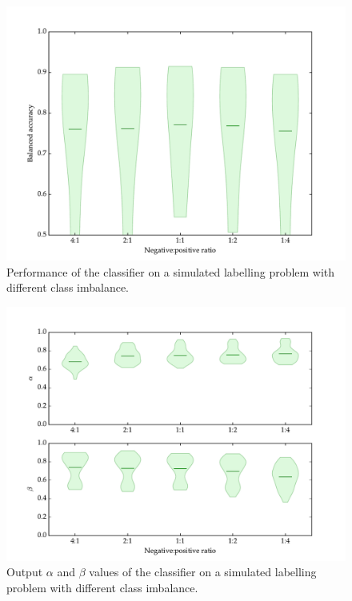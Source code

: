             \begin{figure}[!ht]
                \centering
                \includegraphics[width=\textwidth]
                    {images/experiments/raykar_class_balance_ba}
                \caption{Performance of the \citeauthor{raykar10} classifier on
                    a simulated labelling problem with different class
                    imbalance.}
                \label{fig:raykar-class-balance-ba}
            \end{figure}

            \begin{figure}[!ht]
                \centering
                \includegraphics[width=\textwidth]
                    {images/experiments/raykar_class_balance}
                \caption{Output $\alpha$ and $\beta$ values of the
                    \citeauthor{raykar10} classifier on a simulated labelling
                    problem with different class imbalance.}
                \label{fig:raykar-class-balance-ab}
            \end{figure}

